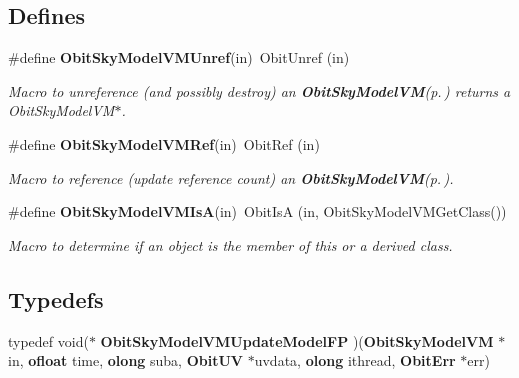 \subsection*{Defines}
\begin{CompactItemize}
\item 
\#define {\bf Obit\-Sky\-Model\-VMUnref}(in)\ Obit\-Unref (in)
\begin{CompactList}\small\item\em Macro to unreference (and possibly destroy) an {\bf Obit\-Sky\-Model\-VM}{\rm (p.\,\pageref{structObitSkyModelVM})} returns a Obit\-Sky\-Model\-VM$\ast$. \item\end{CompactList}\item 
\#define {\bf Obit\-Sky\-Model\-VMRef}(in)\ Obit\-Ref (in)
\begin{CompactList}\small\item\em Macro to reference (update reference count) an {\bf Obit\-Sky\-Model\-VM}{\rm (p.\,\pageref{structObitSkyModelVM})}. \item\end{CompactList}\item 
\#define {\bf Obit\-Sky\-Model\-VMIs\-A}(in)\ Obit\-Is\-A (in, Obit\-Sky\-Model\-VMGet\-Class())
\begin{CompactList}\small\item\em Macro to determine if an object is the member of this or a derived class. \item\end{CompactList}\end{CompactItemize}
\subsection*{Typedefs}
\begin{CompactItemize}
\item 
typedef void($\ast$ {\bf Obit\-Sky\-Model\-VMUpdate\-Model\-FP} )({\bf Obit\-Sky\-Model\-VM} $\ast$in, {\bf ofloat} time, {\bf olong} suba, {\bf Obit\-UV} $\ast$uvdata, {\bf olong} ithread, {\bf Obit\-Err} $\ast$err)
\end{CompactItemize}

